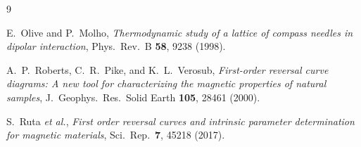 \documentclass[12pt,a4paper]{article}
\begin{document}
\vspace{4pt}
\begin{singlespace}
\begin{thebibliography}{9}
\setlength{\itemsep}{0pt}
\setlength{\parsep}{0pt}

E.~Olive and P.~Molho,
\emph{Thermodynamic study of a lattice of compass needles in dipolar interaction},
Phys.\ Rev.\ B \textbf{58}, 9238 (1998).

A.~P.~Roberts, C.~R.~Pike, and K.~L.~Verosub,
\emph{First-order reversal curve diagrams: A new tool for characterizing the
magnetic properties of natural samples},
J.\ Geophys.\ Res.\ Solid Earth \textbf{105}, 28461 (2000).

S.~Ruta \emph{et al.},
\emph{First order reversal curves and intrinsic parameter determination
for magnetic materials},
Sci.\ Rep.\ \textbf{7}, 45218 (2017).

\end{thebibliography}
\end{singlespace}
\end{document}
